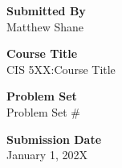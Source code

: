 



\begin{titlepage}
    \centering
    \vspace*{4cm}

    {\large\textbf{Submitted By}} \\
    \vspace{0.2cm}
    {\fontsize{17.28}{20}\selectfont Matthew Shane} \\
    \vspace{1.5cm}

    {\large\textbf{Course Title}} \\
    \vspace{0.2cm}
    {\fontsize{17.28}{20}\selectfont CIS 5XX:\@ Course Title} \\
    \vspace{1.5cm}

    {\large\textbf{Problem Set}} \\
    \vspace{0.2cm}
    {\fontsize{17.28}{20}\selectfont Problem Set \#} \\
    \vspace{1.5cm}

    {\large\textbf{Submission Date}} \\
    \vspace{0.2cm}
    {\fontsize{17.28}{20}\selectfont January 1, 202X} \\

    \vfill
\end{titlepage}

% 
\begin{questions}

\end{questions}



